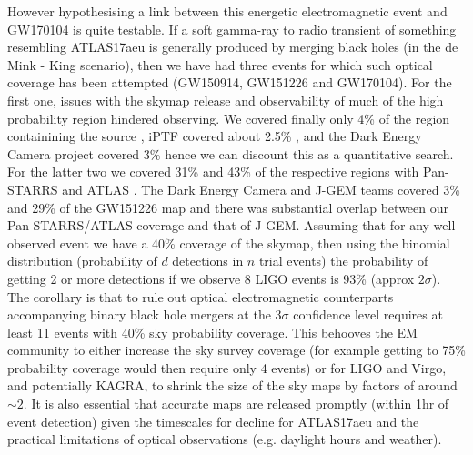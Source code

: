 \documentclass[twocolumn]{aastex61}
\begin{document}
However hypothesising a
link between 
this energetic electromagnetic event and GW170104 
is quite testable.
If a soft gamma-ray to radio transient of something resembling
ATLAS17aeu is generally produced
by merging black holes (in the de Mink - King scenario), 
then we have had three events for which such optical 
coverage has been attempted (GW150914, GW151226 and 
GW170104). For the first one, issues with the skymap 
release  and observability of much of the high probability region
hindered observing. We covered finally only 4\% of the region containining the source 
\citep{2016MNRAS.462.4094S}, iPTF covered about 2.5\% \citep{2016ApJ...824L..24K}, 
and the Dark Energy Camera project covered 3\% \citep{2016ApJ...823L..33S}
hence we can discount this as a quantitative search. 
For the latter two we covered 31\% and 
43\% of the respective regions with Pan-STARRS and ATLAS 
\citep[see][]{2016ApJ...827L..40S}. 
The Dark Energy Camera and J-GEM teams covered 3\% and  29\% of 
the GW151226 map \citep[][respectively]{2016ApJ...826L..29C,2017PASJ...69....9Y}
and there was substantial overlap between our Pan-STARRS/ATLAS coverage and that of 
J-GEM.  Assuming that 
for any well observed event we have a 40\% coverage of
the skymap, then using the binomial distribution (probability of 
$d$ detections in $n$ trial events) the 
probability of getting 2 or more detections if we 
observe 8 LIGO events is 93\% (approx $2\sigma$).
The corollary is that  
to rule out optical 
electromagnetic counterparts accompanying binary 
black hole mergers at the  3$\sigma$ confidence level 
requires at least 11 events with 40\% sky probability coverage. 
This behooves the EM community to either increase the sky survey coverage (for example getting to 75\% probability coverage 
would then require only 4 events) or for LIGO and Virgo, and potentially KAGRA, to 
shrink the size of the sky maps by factors of around $\sim2$. 
It is also essential that accurate maps are released promptly 
(within 1hr of event detection) given the timescales for decline for ATLAS17aeu and the practical limitations of optical observations (e.g. daylight hours and weather).
\end{document}

